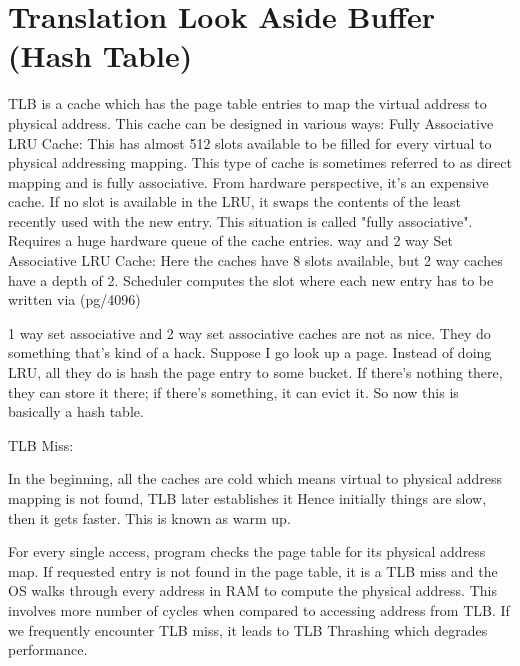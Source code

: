 \documentclass[twoside]{article}
\begin{document}
\section{Translation Look Aside Buffer (Hash Table) }
TLB is a cache which has the page table entries to map the virtual address to physical address. This cache can be designed in various ways: \newline
\newline
Fully Associative LRU Cache: \newline
  This has almost 512 slots available to be filled for every virtual to physical addressing mapping. This type of cache is      
  sometimes referred to as direct mapping and is fully associative.  From hardware perspective, it’s an expensive cache.  If no  slot is      available in the LRU, it swaps the contents of the least recently used with the new entry. This situation is called "fully associative". Requires a huge hardware queue of the cache entries.\newline
{} way and 2 way Set Associative LRU Cache: \newline
  Here the caches have 8 slots available, but 2 way caches have a depth of 2. Scheduler computes the slot where each new entry has to be written via (pg/4096) %
\newline

1 way set associative and 2 way set associative caches are not as nice. They do something that's kind of a hack. Suppose I go look up a page. Instead of doing LRU, all they do is hash the page entry to some bucket. If there's nothing there, they can store it there; if there's something, it can evict it. So now this is basically a hash table.\newline

TLB Miss: 

In the beginning, all the caches are cold which means virtual to physical address mapping is not found, TLB later establishes it Hence initially things are slow, then it gets faster. This is known as warm up.

For every single access, program checks the page table for its physical address map. If requested entry is not found in the page table, it is a TLB miss and the OS walks through every address in RAM to compute the physical address. This involves more number of cycles when compared to accessing address from TLB. If we frequently encounter TLB miss, it leads to TLB Thrashing which degrades performance.
\end{document}
